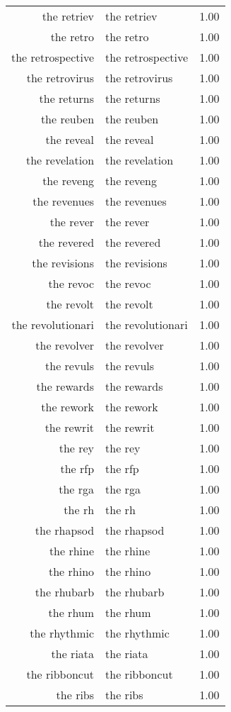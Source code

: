 \begin{table}[ht]
\begin{tabular}{rlr}
  the retriev & the retriev & 1.00 \\ 
  the retro & the retro & 1.00 \\ 
  the retrospective & the retrospective & 1.00 \\ 
  the retrovirus & the retrovirus & 1.00 \\ 
  the returns & the returns & 1.00 \\ 
  the reuben & the reuben & 1.00 \\ 
  the reveal & the reveal & 1.00 \\ 
  the revelation & the revelation & 1.00 \\ 
  the reveng & the reveng & 1.00 \\ 
  the revenues & the revenues & 1.00 \\ 
  the rever & the rever & 1.00 \\ 
  the revered & the revered & 1.00 \\ 
  the revisions & the revisions & 1.00 \\ 
  the revoc & the revoc & 1.00 \\ 
  the revolt & the revolt & 1.00 \\ 
  the revolutionari & the revolutionari & 1.00 \\ 
  the revolver & the revolver & 1.00 \\ 
  the revuls & the revuls & 1.00 \\ 
  the rewards & the rewards & 1.00 \\ 
  the rework & the rework & 1.00 \\ 
  the rewrit & the rewrit & 1.00 \\ 
  the rey & the rey & 1.00 \\ 
  the rfp & the rfp & 1.00 \\ 
  the rga & the rga & 1.00 \\ 
  the rh & the rh & 1.00 \\ 
  the rhapsod & the rhapsod & 1.00 \\ 
  the rhine & the rhine & 1.00 \\ 
  the rhino & the rhino & 1.00 \\ 
  the rhubarb & the rhubarb & 1.00 \\ 
  the rhum & the rhum & 1.00 \\ 
  the rhythmic & the rhythmic & 1.00 \\ 
  the riata & the riata & 1.00 \\ 
  the ribboncut & the ribboncut & 1.00 \\ 
  the ribs & the ribs & 1.00 \\ 

\end{tabular}
\end{table}
